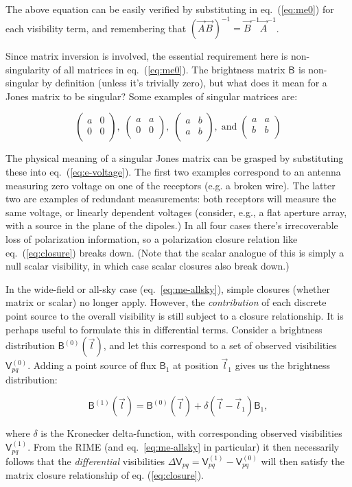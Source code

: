 \documentclass[]{aa}
\newcommand{\matrixtt}[4]{\left( \begin{array}{cc}#1&#2\\#3&#4\\\end{array} \right)}
\newcommand{\jones}[2]{\vec {#1}_{#2}}
\newcommand{\jonesinv}[2]{\vec {#1}^{-1}_{#2}}
\newcommand{\coh}[2]{\mathsf{{#1}}_{{#2}}}
\begin{document}
The above equation can be easily verified by substituting in eq.~(\ref{eq:me0}) for each visibility term, and remembering that $(\jones{A}{}\jones{B}{})^{-1}=\jonesinv{B}{}\jonesinv{A}{}$. 

Since matrix inversion is involved, the essential requirement here is non-singularity of all matrices in eq.~(\ref{eq:me0}). The brightness matrix $\coh{B}{}$ is non-singular by definition (unless it's trivially zero), but what does it mean for a Jones matrix to be singular? Some examples of singular matrices are:

\[
\matrixtt{a}{0}{0}{0}, \; \matrixtt{a}{a}{0}{0}, \; \matrixtt{a}{b}{a}{b},\; \mathrm{and} \; \matrixtt{a}{a}{b}{b}
\]

The physical meaning of a singular Jones matrix can be grasped by substituting these into eq.~(\ref{eq:e-voltage}). The first two examples correspond to an antenna measuring zero voltage on one of the receptors (e.g. a broken wire). The latter two are examples of redundant measurements: both receptors will measure the same voltage, or linearly dependent voltages (consider, e.g., a flat aperture array, with a source in the plane of the dipoles.) In all four cases there's irrecoverable loss of polarization information, so a polarization closure relation like eq.~(\ref{eq:closure}) breaks down. (Note that the scalar analogue of this is simply a null scalar visibility, in which case scalar closures also break down.)

In the wide-field or all-sky case (eq.~\ref{eq:me-allsky}), simple closures (whether matrix or scalar) no longer apply. However, the \emph{contribution} of each discrete point source to the overall visibility is still subject to a closure relationship. It is perhaps useful to formulate this in differential terms. Consider a brightness distribution $\coh{B}{}^{(0)}(\vec l)$, and let this correspond to a set of observed visibilities $\coh{V}{pq}^{(0)}$. Adding a point source of flux $\coh{B}{1}$ at position $\vec l_1$ gives us the brightness distribution:

\[
\coh{B}{}^{(1)}(\vec l) = \coh{B}{}^{(0)}(\vec l)+\delta(\vec l - \vec l_1)\coh{B}{1},
\]

where $\delta$ is the Kronecker delta-function, with corresponding observed visibilities $\coh{V}{pq}^{(1)}$. From the RIME (and eq.~\ref{eq:me-allsky} in particular) it then necessarily follows that the \emph{differential} visibilities $\Delta\coh{V}{pq}=\coh{V}{pq}^{(1)} - \coh{V}{pq}^{(0)}$ will then satisfy the matrix closure relationship of eq. (\ref{eq:closure}).
\end{document}
